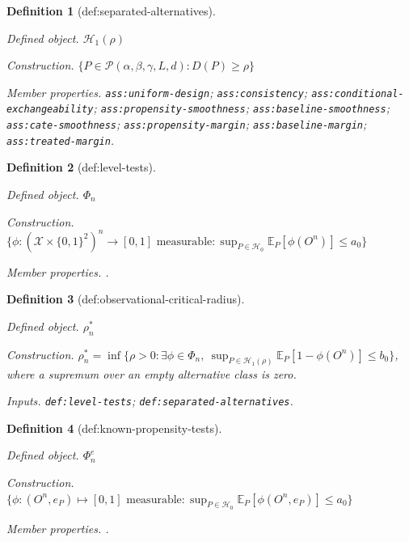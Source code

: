 \documentclass{article}
\newtheorem{definition}{Definition}
\begin{document}
\begin{definition}[def:separated-alternatives]\label{def:separated-alternatives}
\par\smallskip\noindent\emph{Defined object.} \(\mathcal H_1(\rho)\)
\par\smallskip\noindent\emph{Construction.} \(\{P\in\mathcal P(\alpha,\beta,\gamma,L,d):D(P)\ge\rho\}\)
\par\smallskip\noindent\emph{Member properties.} \texttt{ass:\allowbreak{}uniform-\allowbreak{}design}; \texttt{ass:\allowbreak{}consistency}; \texttt{ass:\allowbreak{}conditional-\allowbreak{}exchangeability}; \texttt{ass:\allowbreak{}propensity-\allowbreak{}smoothness}; \texttt{ass:\allowbreak{}baseline-\allowbreak{}smoothness}; \texttt{ass:\allowbreak{}cate-\allowbreak{}smoothness}; \texttt{ass:\allowbreak{}propensity-\allowbreak{}margin}; \texttt{ass:\allowbreak{}baseline-\allowbreak{}margin}; \texttt{ass:\allowbreak{}treated-\allowbreak{}margin}.
\end{definition}

\begin{definition}[def:level-tests]\label{def:level-tests}
\par\smallskip\noindent\emph{Defined object.} \(\Phi_n\)
\par\smallskip\noindent\emph{Construction.} \(\{\phi:(\mathcal X\times\{0,1\}^2)^n\to[0,1]\text{ measurable}:\sup_{P\in\mathcal H_0}\mathbb E_P[\phi(O^n)]\le a_0\}\)
\par\smallskip\noindent\emph{Member properties.} .
\end{definition}

\begin{definition}[def:observational-critical-radius]\label{def:observational-critical-radius}
\par\smallskip\noindent\emph{Defined object.} \(\rho_n^*\)
\par\smallskip\noindent\emph{Construction.} \(\rho_n^*=\inf\{\rho>0:\exists\phi\in\Phi_n,\ \sup_{P\in\mathcal H_1(\rho)}\mathbb E_P[1-\phi(O^n)]\le b_0\}\), where a supremum over an empty alternative class is zero.
\par\smallskip\noindent\emph{Inputs.} \texttt{def:\allowbreak{}level-\allowbreak{}tests}; \texttt{def:\allowbreak{}separated-\allowbreak{}alternatives}.
\end{definition}

\begin{definition}[def:known-propensity-tests]\label{def:known-propensity-tests}
\par\smallskip\noindent\emph{Defined object.} \(\Phi_n^e\)
\par\smallskip\noindent\emph{Construction.} \(\{\phi:(O^n,e_P)\mapsto[0,1]\text{ measurable}:\sup_{P\in\mathcal H_0}\mathbb E_P[\phi(O^n,e_P)]\le a_0\}\)
\par\smallskip\noindent\emph{Member properties.} .
\end{definition}
\end{document}
